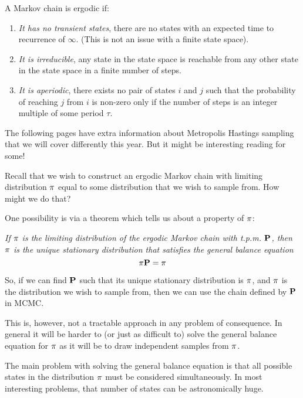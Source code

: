 A Markov chain is ergodic if:
\begin{enumerate}
\item {\sl It has no transient states}, \ie{} there are no states with an expected time to recurrence of $\infty$.  (This is not an issue with a finite state space).
\item {\sl It is irreducible}, \ie{} any state in the state space is reachable from any other state in the state space in a finite number of steps.
\item {\sl It is aperiodic}, \ie{} there exists no pair of states $i$ and $j$ such that the probability of reaching $j$ from $i$ is non-zero only if the number of steps is an integer multiple of some period $\tau$.  
\end{enumerate}


\newpage
\mbox{}

\newpage
\mbox{}

\newpage

The following pages have extra information about Metropolis Hastings sampling that
we will cover differently this year.  But it might be interesting reading for some!


Recall that we wish to construct an ergodic Markov chain with limiting distribution ${\pi}$ equal to some distribution that we wish to sample from.  How might we do that?

One possibility is via a theorem which tells us about a property of ${\pi}$:

{\sl If ${\pi}$ is the limiting distribution of the ergodic Markov chain with t.p.m. $\mathbf{P}$, then ${\pi}$ is the unique stationary distribution that satisfies the general balance equation}
\[
	{\pi}\mathbf{P} = {\pi}
\]

So, if we can find $\mathbf{P}$ such that its unique stationary distribution is ${\pi}$, and ${\pi}$ is the distribution we wish to sample from, then we can use the chain defined by $\mathbf{P}$ in MCMC.

This is, however, not a tractable approach in any problem of consequence.  In general it will be harder to (or just as difficult to) solve the general balance equation for ${\pi}$ as it will be to draw independent samples from ${\pi}$.

The main problem with solving the general balance equation is that all possible states in the distribution ${\pi}$ must be considered simultaneously.  In most interesting problems, that number of states can be astronomically huge.  

